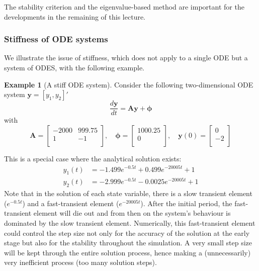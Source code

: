 \documentclass[a4paper,11pt]{article}
\newcommand{\bm}{\mathbf}
\newcommand{\bs}{\boldsymbol}
\theoremstyle{definition}
\newtheorem{exmp}{Example}[section]
\begin{document}
The stability criterion and the eigenvalue-based method are important for the developments in the remaining of this lecture.


\subsubsection*{Stiffness of ODE systems}

We illustrate the issue of stiffness, which does not apply to a single ODE but a system of ODES, 
with the following example.

\begin{exmp}[A stiff ODE system]
\label{exmp:stiff}
Consider the following two-dimensional ODE system $\bm y = [y_1, y_2]'$
\begin{equation} 
	\frac{d \bm y}{d t} = \bm A \bm y + \bs \phi
\end{equation}
\noindent with
\begin{equation}
	\bm A = \left[
		\begin{array}{cc}
			-2000 & 999.75 \\
			1       & -1 \\
		\end{array} \right], \quad
	\bs \phi = \left[
		\begin{array}{c}
			1000.25 \\
			0 \\
		\end{array} \right], \quad
	\bm y(0) = \left[
		\begin{array}{c}
			0 \\
			-2 \\
		\end{array} \right]
\end{equation} 

This is a special case where the analytical solution exists:
\begin{align}
	y_1(t) &= -1.499 e^{-0.5 t} + 0.499 e^{-20005 t} + 1 \\
	y_2(t) &= -2.999 e^{-0.5 t} - 0.0025 e^{-20005 t} + 1 	
\end{align}
Note that in the solution of each state variable, there is a slow transient element ($e^{-0.5 t}$)
and a fast-transient element ($e^{-20005 t}$). After the initial period, the fast-transient element will die out 
and from then on the system’s behaviour is dominated by the slow transient element. Numerically, this fast-transient element 
could control the step size not only for the accuracy of the solution at the early stage but also for the stability throughout the simulation. 
A very small step size will be kept through the entire solution process, hence making a (unnecessarily) very inefficient process (too many solution steps).

\end{exmp}
\end{document}
